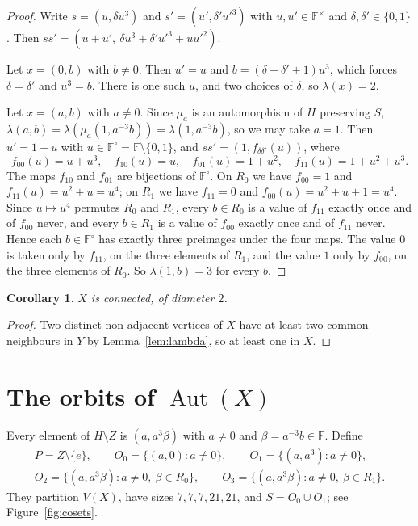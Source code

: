 \documentclass[preprint,12pt]{elsarticle}
\newtheorem{corollary}[theorem]{Corollary}
\theoremstyle{definition}
\newcommand{\F}{\mathbb{F}}
\newcommand{\Aut}{\operatorname{Aut}}
\begin{document}
\begin{proof}
Write $s=(u,\delta u^3)$ and $s'=(u',\delta'u'^3)$ with $u,u'\in\F^\times$ and $\delta,\delta'\in\{0,1\}$. Then $ss'=(u+u',\ \delta u^3+\delta'u'^3+uu'^2)$.

Let $x=(0,b)$ with $b\ne0$. Then $u'=u$ and $b=(\delta+\delta'+1)u^3$, which forces $\delta=\delta'$ and $u^3=b$. There is one such $u$, and two choices of $\delta$, so $\lambda(x)=2$.

Let $x=(a,b)$ with $a\ne0$. Since $\mu_a$ is an automorphism of $H$ preserving $S$, $\lambda(a,b)=\lambda(\mu_{a}(1,a^{-3}b))=\lambda(1,a^{-3}b)$, so we may take $a=1$. Then $u'=1+u$ with $u\in\F^\circ=\F\setminus\{0,1\}$, and $ss'=(1,f_{\delta\delta'}(u))$, where
\[
f_{00}(u)=u+u^3,\quad f_{10}(u)=u,\quad f_{01}(u)=1+u^2,\quad f_{11}(u)=1+u^2+u^3.
\]
The maps $f_{10}$ and $f_{01}$ are bijections of $\F^\circ$. On $R_0$ we have $f_{00}=1$ and $f_{11}(u)=u^2+u=u^4$; on $R_1$ we have $f_{11}=0$ and $f_{00}(u)=u^2+u+1=u^4$. Since $u\mapsto u^4$ permutes $R_0$ and $R_1$, every $b\in R_0$ is a value of $f_{11}$ exactly once and of $f_{00}$ never, and every $b\in R_1$ is a value of $f_{00}$ exactly once and of $f_{11}$ never. Hence each $b\in\F^\circ$ has exactly three preimages under the four maps. The value $0$ is taken only by $f_{11}$, on the three elements of $R_1$, and the value $1$ only by $f_{00}$, on the three elements of $R_0$. So $\lambda(1,b)=3$ for every $b$.
\end{proof}

\begin{corollary}\label{cor:conn}
$X$ is connected, of diameter $2$.
\end{corollary}

\begin{proof}
Two distinct non-adjacent vertices of $X$ have at least two common neighbours in $Y$ by Lemma~\ref{lem:lambda}, so at least one in $X$.
\end{proof}

\section{The orbits of \texorpdfstring{$\Aut(X)$}{Aut(X)}}\label{sec:orbits}

Every element of $H\setminus Z$ is $(a,a^3\beta)$ with $a\ne0$ and $\beta=a^{-3}b\in\F$. Define
\begin{gather*}
P=Z\setminus\{e\},\qquad O_0=\{(a,0):a\ne0\},\qquad O_1=\{(a,a^3):a\ne0\},\\
O_2=\{(a,a^3\beta):a\ne0,\ \beta\in R_0\},\qquad O_3=\{(a,a^3\beta):a\ne0,\ \beta\in R_1\}.
\end{gather*}
They partition $V(X)$, have sizes $7,7,7,21,21$, and $S=O_0\cup O_1$; see Figure~\ref{fig:cosets}.
\end{document}
